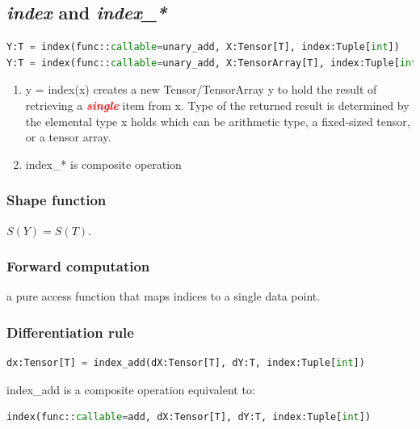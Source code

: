 \subsection{\textit{\textbf{index}} and \textit{\textbf{index\_*}}}

\begin{lstlisting}[language=Python]
Y:T = index(func::callable=unary_add, X:Tensor[T], index:Tuple[int])
Y:T = index(func::callable=unary_add, X:TensorArray[T], index:Tuple[int])
\end{lstlisting}

\begin{enumerate}
  \item y = index(x) creates a new Tensor/TensorArray y to hold the result of retrieving a \textbf{\textit{\textcolor{red}{single}}} item from x. Type of the returned result is determined by the elemental type x holds which can be arithmetic type, a fixed-sized tensor, or a tensor array.

  \item index\_* is composite operation
\end{enumerate}

\subsubsection{Shape function}

$S(Y) = S(T)$.

\subsubsection{Forward computation}

a pure access function that maps indices to a single data point.


\subsubsection{Differentiation rule}

\begin{lstlisting}[language=Python]
dx:Tensor[T] = index_add(dX:Tensor[T], dY:T, index:Tuple[int])
\end{lstlisting}

index\_add is a composite operation equivalent to:

\begin{lstlisting}[language=Python]
index(func::callable=add, dX:Tensor[T], dY:T, index:Tuple[int])
\end{lstlisting}

